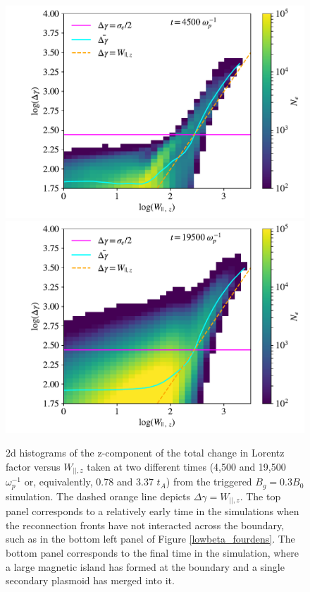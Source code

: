 \begin{figure}[htp] 
	\centering
	\includegraphics[width=.6\linewidth]{bguide3_triggered_final2dhist_withmean15.pdf}
	\includegraphics[width=.6\linewidth]{bguide3_triggered_final2dhist_withmean65.pdf}
	
	\caption{2d histograms of the z-component of the total change in Lorentz factor versus $W_{||,z}$  taken at two different times (4,500 and 19,500 $\omega_{p}^{-1}$ or, equivalently, 0.78 and 3.37 $t_{A}$) from the triggered $B_{g}=0.3B_{0}$ simulation.  The dashed orange line depicts $\Delta \gamma = W_{||,z}$.  The top panel corresponds to a relatively early time in the simulations when the reconnection fronts have not interacted across the boundary, such as in the bottom left panel of Figure \ref{lowbeta_fourdens}.  The bottom panel corresponds to the final time in the simulation, where a large magnetic island has formed at the boundary and a single secondary plasmoid has merged into it.}
	\label{wpar_hist_earlytime}
\end{figure}


